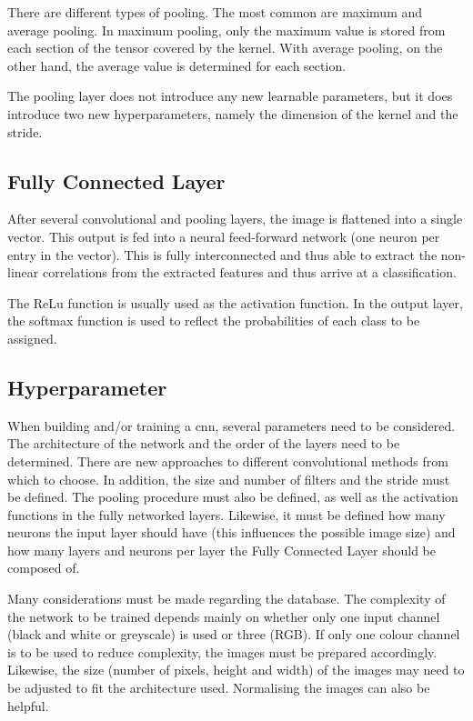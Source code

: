 There are different types of pooling. The most common are maximum and average pooling. In maximum pooling, only the maximum value is stored from each section of the tensor covered by the kernel. With average pooling, on the other hand, the average value is determined for each section. \cite{Saha:2018}

The pooling layer does not introduce any new learnable parameters, but it does introduce two new hyperparameters, namely the dimension of the kernel and the stride. \cite{Michelucci:2019}

\subsection{Fully Connected Layer}

After several convolutional and pooling layers, the image is flattened into a single vector. This output is fed into a neural feed-forward network (one neuron per entry in the vector). This is fully interconnected and thus able to extract the non-linear correlations from the extracted features and thus arrive at a classification.\cite{Saha:2018}

The ReLu function is usually used as the activation function. In the output layer, the softmax function is used to reflect the probabilities of each class to be assigned. \cite{Arunava:2018}


\subsection{Hyperparameter}

When building and/or training a \ac{cnn}, several parameters need to be considered. The architecture of the network and the order of the layers need to be determined. There are new approaches to different convolutional methods from which to choose. In addition, the size and number of filters and the stride must be defined. The pooling procedure must also be defined, as well as the activation functions in the fully networked layers. Likewise, it must be defined how many neurons the input layer should have (this influences the possible image size) and how many layers and neurons per layer the Fully Connected Layer should be composed of.

Many considerations must be made regarding the database. The complexity of the network to be trained depends mainly on whether only one input channel (black and white or greyscale) is used or three (RGB). If only one colour channel is to be used to reduce complexity, the images must be prepared accordingly. Likewise, the size (number of pixels, height and width) of the images may need to be adjusted to fit the architecture used. Normalising the images can also be helpful.

